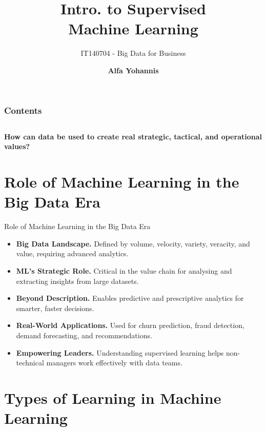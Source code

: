 \documentclass[aspectratio=169, table]{beamer}
\title{\Huge Intro. to Supervised \\
\vspace{10pt}
Machine Learning}
\subtitle{IT140704 - Big Data for Business}
\author{\textbf{Alfa Yohannis}}
\begin{document}
\frame{\titlepage}


\begin{frame}[fragile]
\frametitle{Contents}
\vspace{20pt}
\begin{columns}[t]
	\tableofcontents[sections={1-5}]
	
	\tableofcontents[sections={6-20}]
\end{columns}
\end{frame}

\begin{frame}{\hfill}
	\centering
	\Huge{\textbf{How can data be used to create real strategic, tactical, and operational values?}}
\end{frame}


\section{Role of Machine Learning in the Big Data Era}

\begin{frame}{Role of Machine Learning in the Big Data Era}
	\vspace{20pt}
	\begin{itemize}
		\item \textbf{Big Data Landscape.} Defined by volume, velocity, variety, veracity, and value, requiring advanced analytics.
		\item \textbf{ML's Strategic Role.} Critical in the value chain for analysing and extracting insights from large datasets.
		\item \textbf{Beyond Description.} Enables predictive and prescriptive analytics for smarter, faster decisions.
		\item \textbf{Real-World Applications.} Used for churn prediction, fraud detection, demand forecasting, and recommendations.
		\item \textbf{Empowering Leaders.} Understanding supervised learning helps non-technical managers work effectively with data teams.
	\end{itemize}
\end{frame}

\section{Types of Learning in Machine Learning}
\end{document}

